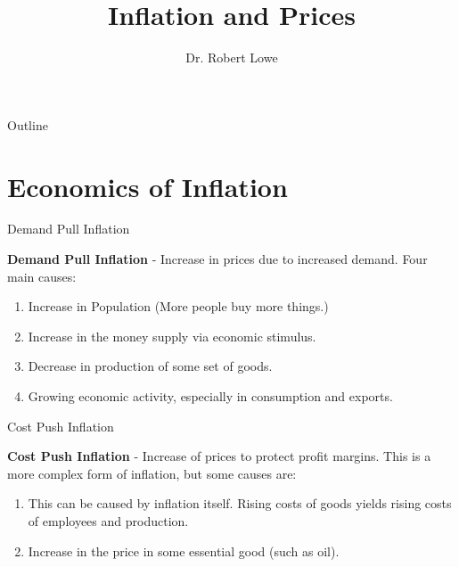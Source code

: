 \documentclass[]{beamer}
\title{Inflation and Prices}
\author{Dr. Robert Lowe\\}
\institute[Maryville College] %
{
  Division of Mathematics and Computer Science\\
  Maryville College
}
\date[]{}
\begin{document}
\begin{frame}
  \titlepage
\end{frame}

\begin{frame}{Outline}
  \tableofcontents
\end{frame}





\section{Economics of Inflation}

\begin{frame}{Demand Pull Inflation}
    \par\textbf{Demand Pull Inflation} - Increase in prices due to increased demand. Four main causes:
    \begin{enumerate}[<+(1)->]
        \item Increase in Population (More people buy more things.)
        \item Increase in the money supply via economic stimulus.
        \item Decrease in production of some set of goods.
        \item Growing economic activity, especially in consumption and exports.
    \end{enumerate}
\end{frame}

\begin{frame}{Cost Push Inflation}
    \par\textbf{Cost Push Inflation} - Increase of prices to protect profit margins. This is a more complex form of inflation, but some causes are:
    \begin{enumerate}[<+(1)->]
        \item This can be caused by inflation itself.  Rising costs of goods yields rising costs of employees and production.
        \item Increase in the price in some essential good (such as oil).
    \end{enumerate}
\end{frame}
\end{document}
